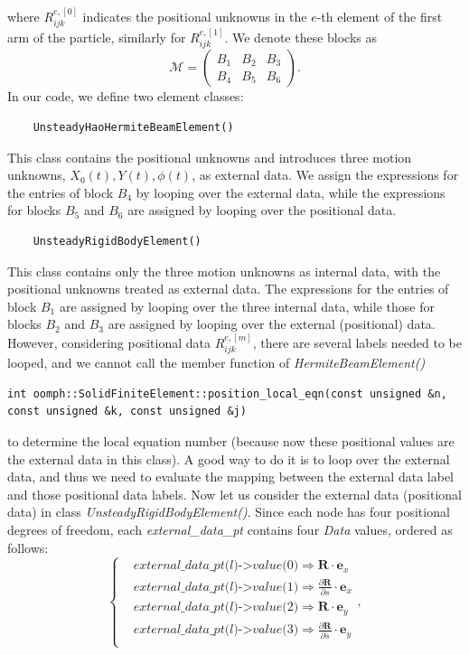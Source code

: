 \documentclass[a4paper,12pt]{article}
\begin{document}
where $R_{ijk}^{e,[0]}$ indicates the positional unknowns in the $e$-th element of the first arm of the particle, similarly for $R_{ijk}^{e,[1]}$.
We denote these blocks as 
\begin{equation}
	\label{eqn:117}
\bm{\mathcal{M}}=\begin{pmatrix}
	B_1 & B_2 & B_3\\
	B_4 & B_5 & B_6
\end{pmatrix}.
\end{equation}
In our code, we define two element classes:
\begin{lstlisting}
	UnsteadyHaoHermiteBeamElement()
\end{lstlisting}
This class contains the positional unknowns and introduces three motion unknowns, $X_0(t), Y(t), \phi(t)$, as external data. We assign the expressions for the entries of block $B_4$ by looping over the external data, while the expressions for blocks $B_5$ and $B_6$ are assigned by looping over the positional data.
\begin{lstlisting}
	UnsteadyRigidBodyElement()
\end{lstlisting}
This class contains only the three motion unknowns as internal data, with the positional unknowns treated as external data. The expressions for the entries of block $B_1$ are assigned by looping over the three internal data, while those for blocks $B_2$ and $B_3$ are assigned by looping over the external (positional) data. However, considering positional data $R_{ijk}^{e,[m]}$, there are several labels needed to be looped, and we cannot call the member function of \textit{HermiteBeamElement()}
\begin{lstlisting}
int oomph::SolidFiniteElement::position_local_eqn(const unsigned &n, const unsigned &k, const unsigned &j) 	
\end{lstlisting}
to determine the local equation number (because now these positional values are the external data in this class). A good way to do it is to loop over the external data, and thus we need to evaluate the mapping between the external data label and those positional data labels.
Now let us consider the external data (positional data) in class \textit{UnsteadyRigidBodyElement()}. Since each node has four positional degrees of freedom, each \textit{external\_data\_pt} contains four \textit{Data} values, ordered as follows:
\begin{equation}
	\label{eqn:118}
	\left\{\begin{aligned}
		&\textit{external\_data\_pt(l)->value(0)} \Longrightarrow \bm{R}\cdot \bm{e}_x\\
		&\textit{external\_data\_pt(l)->value(1)} \Longrightarrow \frac{\partial\bm{R}}{\partial s}\cdot \bm{e}_x\\
		&\textit{external\_data\_pt(l)->value(2)} \Longrightarrow \bm{R}\cdot \bm{e}_y\\
		&\textit{external\_data\_pt(l)->value(3)} \Longrightarrow \frac{\partial\bm{R}}{\partial s}\cdot \bm{e}_y\\
	\end{aligned}\right.,
\end{equation}
\end{document}
